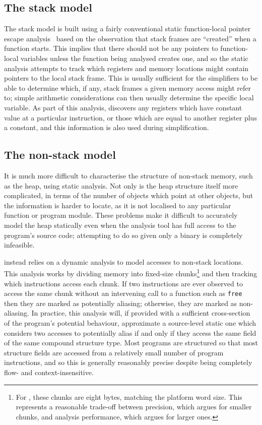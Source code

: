 \subsection{The stack model}
The stack model is built using a fairly conventional static
function-local pointer escape analysis~\cite[Pages
  140--141]{Appel2004} based on the observation that stack frames are
``created'' when a function starts.  This implies that there should
not be any pointers to function-local variables unless the function
being analysed creates one, and so the static analysis attempts to
track which registers and memory locations might contain pointers to
the local stack frame.  This is usually sufficient for the
{\StateMachine} simplifiers to be able to determine which, if any,
stack frames a given memory access might refer to; simple arithmetic
considerations can then usually determine the specific local variable.
As part of this analysis, {\technique} discovers any registers which
have constant value at a particular instruction, or those which are
equal to another register plus a constant, and this information is
also used during {\StateMachine} simplification.

\subsection{The non-stack model}
It is much more difficult to characterise the structure of non-stack
memory, such as the heap, using static analysis.  Not only is the heap
structure itself more complicated, in terms of the number of objects
which point at other objects, but the information is harder to locate,
as it is not localised to any particular function or program module.
These problems make it difficult to accurately model the heap
statically even when the analysis tool has full access to the
program's source code; attempting to do so given only a binary is
completely infeasible.

{\Technique} instead relies on a dynamic analysis to model accesses to
non-stack locations.  This analysis works by dividing memory into
fixed-size chunks\footnote{For {\implementation}, these chunks are
  eight bytes, matching the platform word size. This represents a
  reasonable trade-off between precision, which argues for smaller
  chunks, and analysis performance, which argues for larger ones.} and
then tracking which instructions access each chunk.  If two
instructions are ever observed to access the same chunk without an
intervening call to a function such as \texttt{free} then they are
marked as potentially aliasing; otherwise, they are marked as
non-aliasing.  In practice, this analysis will, if provided with a
sufficient cross-section of the program's potential behaviour,
approximate a source-level static one which considers two accesses to
potentially alias if and only if they access the same field of the
same compound structure type.  Most programs are structured so that
most structure fields are accessed from a relatively small number of
program instructions, and so this is generally reasonably precise
despite being completely flow- and context-insensitive.

